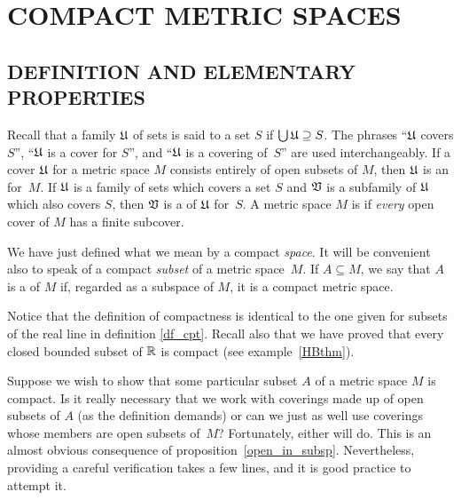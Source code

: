 \chapter{COMPACT METRIC SPACES}\label{cpt}



\section{DEFINITION AND ELEMENTARY PROPERTIES}
\begin{defn} Recall that a family $\mathfrak{U}$ of sets is said to
 a set $S$ if $\bigcup \mathfrak{U} \supseteq S$.  The phrases ``$\mathfrak{U}$ covers
$S$'', ``$\mathfrak{U}$ is a cover for $S$'', and ``$\mathfrak{U}$ is a covering of~$S$'' are used
interchangeably.  If a cover $\mathfrak{U}$ for a metric space $M$ consists entirely of open
subsets of $M$, then $\mathfrak{U}$ is an
 for~$M$.  If $\mathfrak{U}$ is a family of sets which covers a set $S$ and
$\mathfrak{V}$ is a subfamily of $\mathfrak{U}$ which also covers $S$, then $\mathfrak{V}$ is a
 of $\mathfrak{U}$ for~$S$.  A metric space $M$ is
 if \emph{every} open cover of $M$ has a finite subcover.

We have just defined what we mean by a compact \emph{space}. It will be convenient also to
speak of a compact \emph{subset} of a metric space~$M$.  If $A \subseteq M$, we say that $A$
is a
 of $M$ if, regarded as a subspace of $M$, it is a compact metric space.
\end{defn}

Notice that the definition of compactness is identical to the one given for subsets of the
real line in definition \ref{df_cpt}. Recall also that we have proved that every closed
bounded subset of $\mathbb{R}$ is compact (see example~\ref{HBthm}).

\begin{rem} Suppose we wish to show that some particular
subset $A$ of a metric space $M$ is compact. Is it really necessary that we work with
coverings made up of open subsets of $A$ (as the definition demands) or can we just as well
use coverings whose members are open subsets of~$M$?  Fortunately, either will do. This is an
almost obvious consequence of proposition~\ref{open_in_subsp}.  Nevertheless, providing a
careful verification takes a few lines, and it is good practice to attempt it.
\end{rem}

